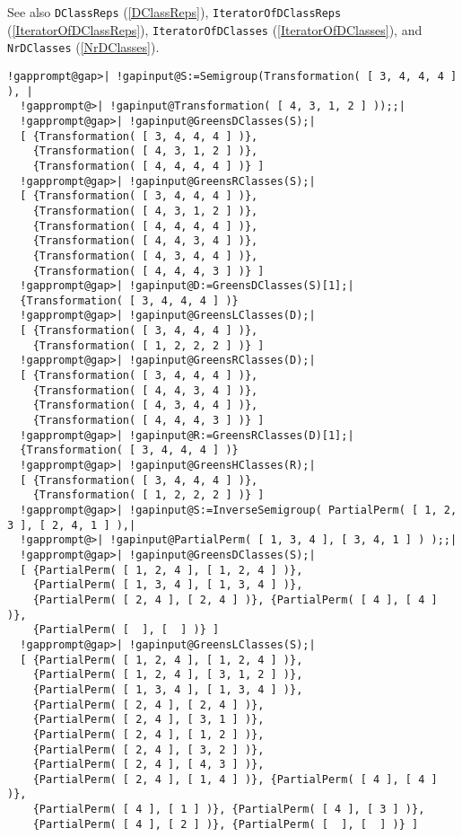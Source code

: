 \documentclass[a4paper,11pt]{report}
\begin{document}
{{{ See also \texttt{DClassReps} (\ref{DClassReps}), \texttt{IteratorOfDClassReps} (\ref{IteratorOfDClassReps}), \texttt{IteratorOfDClasses} (\ref{IteratorOfDClasses}), and \texttt{NrDClasses} (\ref{NrDClasses}). 
\begin{Verbatim}[commandchars=!@|,fontsize=\small,frame=single,label=Example]
  !gapprompt@gap>| !gapinput@S:=Semigroup(Transformation( [ 3, 4, 4, 4 ] ), |
  !gapprompt@>| !gapinput@Transformation( [ 4, 3, 1, 2 ] ));;|
  !gapprompt@gap>| !gapinput@GreensDClasses(S);|
  [ {Transformation( [ 3, 4, 4, 4 ] )}, 
    {Transformation( [ 4, 3, 1, 2 ] )}, 
    {Transformation( [ 4, 4, 4, 4 ] )} ]
  !gapprompt@gap>| !gapinput@GreensRClasses(S);|
  [ {Transformation( [ 3, 4, 4, 4 ] )}, 
    {Transformation( [ 4, 3, 1, 2 ] )}, 
    {Transformation( [ 4, 4, 4, 4 ] )}, 
    {Transformation( [ 4, 4, 3, 4 ] )}, 
    {Transformation( [ 4, 3, 4, 4 ] )}, 
    {Transformation( [ 4, 4, 4, 3 ] )} ]
  !gapprompt@gap>| !gapinput@D:=GreensDClasses(S)[1];|
  {Transformation( [ 3, 4, 4, 4 ] )}
  !gapprompt@gap>| !gapinput@GreensLClasses(D);|
  [ {Transformation( [ 3, 4, 4, 4 ] )}, 
    {Transformation( [ 1, 2, 2, 2 ] )} ]
  !gapprompt@gap>| !gapinput@GreensRClasses(D);|
  [ {Transformation( [ 3, 4, 4, 4 ] )}, 
    {Transformation( [ 4, 4, 3, 4 ] )}, 
    {Transformation( [ 4, 3, 4, 4 ] )}, 
    {Transformation( [ 4, 4, 4, 3 ] )} ]
  !gapprompt@gap>| !gapinput@R:=GreensRClasses(D)[1];|
  {Transformation( [ 3, 4, 4, 4 ] )}
  !gapprompt@gap>| !gapinput@GreensHClasses(R);|
  [ {Transformation( [ 3, 4, 4, 4 ] )}, 
    {Transformation( [ 1, 2, 2, 2 ] )} ]
  !gapprompt@gap>| !gapinput@S:=InverseSemigroup( PartialPerm( [ 1, 2, 3 ], [ 2, 4, 1 ] ),|
  !gapprompt@>| !gapinput@PartialPerm( [ 1, 3, 4 ], [ 3, 4, 1 ] ) );;|
  !gapprompt@gap>| !gapinput@GreensDClasses(S);|
  [ {PartialPerm( [ 1, 2, 4 ], [ 1, 2, 4 ] )}, 
    {PartialPerm( [ 1, 3, 4 ], [ 1, 3, 4 ] )}, 
    {PartialPerm( [ 2, 4 ], [ 2, 4 ] )}, {PartialPerm( [ 4 ], [ 4 ] )}, 
    {PartialPerm( [  ], [  ] )} ]
  !gapprompt@gap>| !gapinput@GreensLClasses(S);|
  [ {PartialPerm( [ 1, 2, 4 ], [ 1, 2, 4 ] )}, 
    {PartialPerm( [ 1, 2, 4 ], [ 3, 1, 2 ] )}, 
    {PartialPerm( [ 1, 3, 4 ], [ 1, 3, 4 ] )}, 
    {PartialPerm( [ 2, 4 ], [ 2, 4 ] )}, 
    {PartialPerm( [ 2, 4 ], [ 3, 1 ] )}, 
    {PartialPerm( [ 2, 4 ], [ 1, 2 ] )}, 
    {PartialPerm( [ 2, 4 ], [ 3, 2 ] )}, 
    {PartialPerm( [ 2, 4 ], [ 4, 3 ] )}, 
    {PartialPerm( [ 2, 4 ], [ 1, 4 ] )}, {PartialPerm( [ 4 ], [ 4 ] )}, 
    {PartialPerm( [ 4 ], [ 1 ] )}, {PartialPerm( [ 4 ], [ 3 ] )}, 
    {PartialPerm( [ 4 ], [ 2 ] )}, {PartialPerm( [  ], [  ] )} ]

\end{Verbatim}}}}
\end{document}
